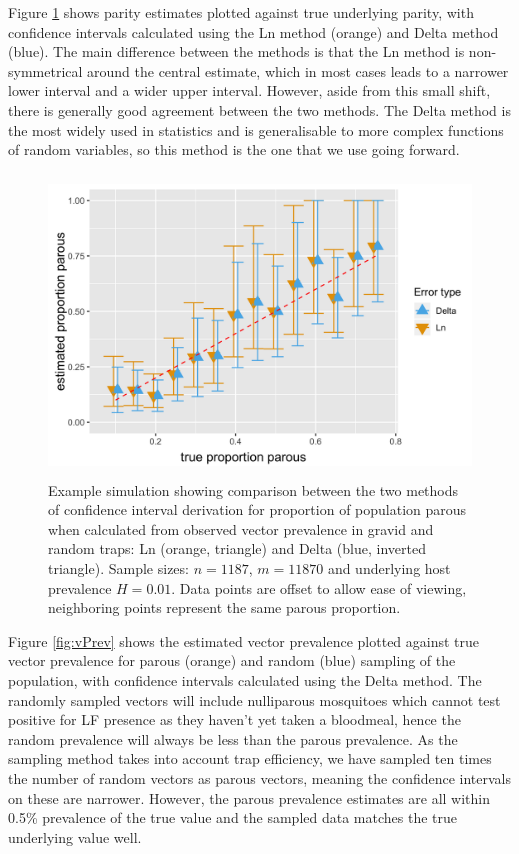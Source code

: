 Figure \ref{fig:parity} shows parity estimates plotted against true underlying parity, with confidence intervals calculated using the Ln method (orange) and Delta method (blue). The main difference between the methods is that the Ln method is non-symmetrical around the central estimate, which in most cases leads to a narrower lower interval and a wider upper interval. However, aside from this small shift, there is generally good agreement between the two methods. The Delta method is the most widely used in statistics and is generalisable to more complex functions of random variables, so this method is the one that we use going forward.

\begin{figure}[h]
\begin{center}
\includegraphics[height=8cm]{Project/Figures/Xeno/ParousEst.png}
\end{center}
\caption{Example simulation showing comparison between the two methods of confidence interval derivation for proportion of population parous when calculated from observed vector prevalence in gravid and random traps: Ln (orange, triangle) and Delta (blue, inverted triangle). Sample sizes: $n=1187$, $m=11870$ and underlying host prevalence $H=0.01$. Data points are offset to allow ease of viewing, neighboring points represent the same parous proportion.}
\label{fig:parity}
\end{figure}

Figure \ref{fig:vPrev} shows the estimated vector prevalence plotted against true vector prevalence for parous (orange) and random (blue) sampling of the population, with confidence intervals calculated using the Delta method. The randomly sampled vectors will include nulliparous mosquitoes which cannot test positive for LF presence as they haven't yet taken a bloodmeal, hence the random prevalence will always be less than the parous prevalence. As the sampling method takes into account trap efficiency, we have sampled ten times the number of random vectors as parous vectors, meaning the confidence intervals on these are narrower. However, the parous prevalence estimates are all within 0.5\% prevalence of the true value and the sampled data matches the true underlying value well.

